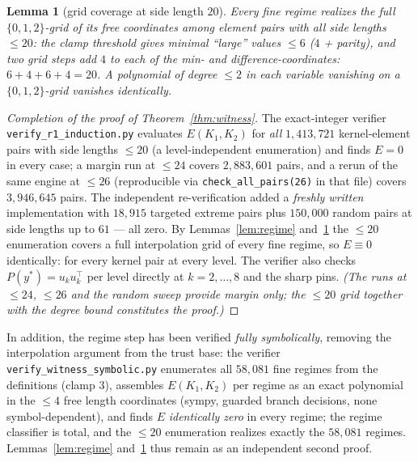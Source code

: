 \documentclass[11pt]{article}
\newtheorem{lemma}[theorem]{Lemma}
\begin{document}
\begin{lemma}[grid coverage at side length $20$]\label{lem:grid}
Every fine regime realizes the full $\{0,1,2\}$-grid of its free
coordinates among element pairs with all side lengths $\le20$: the clamp
threshold gives minimal ``large'' values $\le6$ ($4$ + parity), and two
grid steps add $4$ to each of the min- and difference-coordinates:
$6+4+6+4=20$. A polynomial of degree $\le2$ in each variable vanishing on
a $\{0,1,2\}$-grid vanishes identically.
\end{lemma}

\begin{proof}[Completion of the proof of Theorem~\ref{thm:witness}]
The exact-integer verifier \texttt{verify\_r1\_induction.py} evaluates
$E(K_1,K_2)$ for \emph{all} $1{,}413{,}721$ kernel-element pairs with side
lengths $\le20$ (a level-independent enumeration) and finds $E=0$ in every
case; a margin run at $\le24$ covers $2{,}883{,}601$ pairs, and a rerun of
the same engine at $\le26$ (reproducible via \texttt{check\_all\_pairs(26)}
in that file) covers $3{,}946{,}645$ pairs. The independent
re-verification added a \emph{freshly written} implementation with
$18{,}915$ targeted extreme pairs plus $150{,}000$ random pairs at side
lengths up to $61$ --- all zero. By Lemmas~\ref{lem:regime} and~\ref{lem:grid} the $\le20$
enumeration covers a full interpolation grid of every fine regime, so
$E\equiv0$ identically: for every kernel pair at every level. The verifier
also checks $P(y^\ast)=u_ku_k^\top$ per level directly at $k=2,\dots,8$
and the sharp pins. \emph{(The runs at $\le24$, $\le26$ and the random
sweep provide margin only; the $\le20$ grid together with the degree
bound constitutes the proof.)}
\end{proof}

In addition, the regime step has been verified \emph{fully symbolically},
removing the interpolation argument from the trust base: the verifier
\texttt{verify\_witness\_symbolic.py} enumerates all $58{,}081$ fine regimes
from the definitions (clamp $3$), assembles $E(K_1,K_2)$ per regime as an exact
polynomial in the $\le4$ free length coordinates (sympy, guarded branch
decisions, none symbol-dependent), and finds $E$ \emph{identically zero} in
every regime; the regime classifier is total, and the $\le20$ enumeration
realizes exactly the $58{,}081$ regimes. Lemmas~\ref{lem:regime}
and~\ref{lem:grid} thus remain as an independent second proof.
\end{document}
